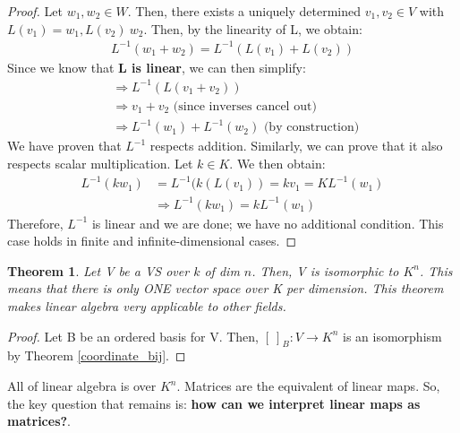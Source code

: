 \documentclass[a4paper, 12pt]{article}
\newtheorem{theorem}{Theorem}
\theoremstyle{definition}
\theoremstyle{definition}
\theoremstyle{definition}
\theoremstyle{definition}
\begin{document}
{\begin{proof}
	Let $w_1, w_2 \in W$. Then, there exists  a uniquely determined $v_1, v_2 \in V$ with $L(v_1) = w_1, L(v_2) \ w_2$. Then, by the linearity of L, we obtain: 
	\begin{align*}
		L^{-1} (w_1 + w_2) = L^{-1} (L(v_1) + L(v_2)) 
	\end{align*}
	Since we know that \textbf{L is linear}, we can then simplify: 
	\begin{align*}
		& \Rightarrow L^{-1}(L(v_1 + v_2)) \\
		& \Rightarrow v_1 + v_2 \mbox{ (since inverses cancel out) } \\
		& \Rightarrow L^{-1}(w_1) + L^{-1}(w_2) 		\mbox{ (by construction) }
	\end{align*}
	We have proven that $L^{-1}$ respects addition. Similarly, we can prove that it also respects scalar multiplication. Let $k \in K$. We then obtain: 
	\begin{align*}
		L^{-1} (k w_1)&  = L^{-1}(k(L(v_1)) = kv_1 = K L^{-1} (w_1) \\
		& \Rightarrow L^{-1}(kw_1) = kL^{-1}(w_1) 
	\end{align*}
	Therefore, $L^{-1}$ is linear and we are done; we have no additional condition. This case holds in finite and infinite-dimensional cases. 
\end{proof}
\begin{theorem}
	Let V be a VS over $k$ of dim $n$. Then, V is isomorphic to $K^n$. This means that there is only ONE vector space over K per dimension. This theorem makes linear algebra very applicable to other fields. 
\end{theorem}
\begin{proof}
	Let B be an ordered basis for V. Then, $[\ ]_B: V \rightarrow K^n$ is an isomorphism by Theorem \ref{coordinate_bij}.  
\end{proof}
All of linear algebra is over $K^n$. Matrices are the equivalent of linear maps. So, the key question that remains is: \textbf{how can we interpret linear maps as matrices?}. 

}
\end{document}
